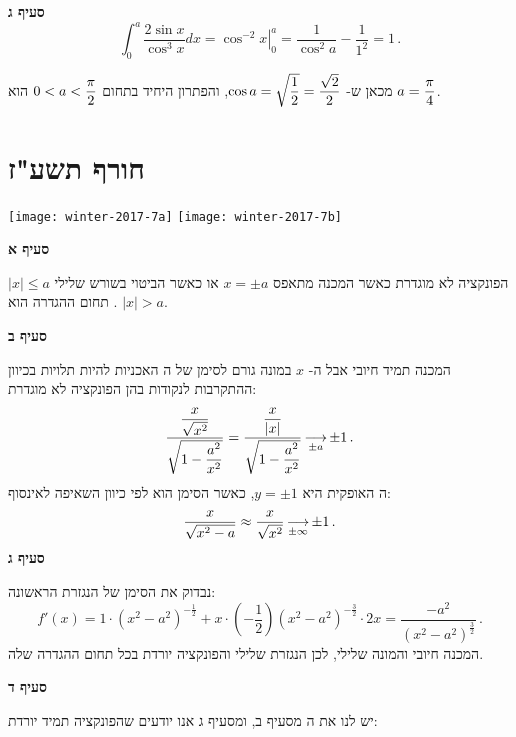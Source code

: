 \textbf{סעיף ג}
\[
\int_0^a \frac{2\sin x}{\cos^3 x}dx = \left. \cos^{-2} x \right|_0^a=\frac{1}{\cos^2 a}-\frac{1}{1^2}=1\,.
\]

מכאן ש-%
$\cos a=\sqrt{\displaystyle\frac{1}{2}}=\displaystyle\frac{\sqrt{2}}{2}$,
והפתרון היחיד בתחום
$0<a<\displaystyle\frac{\pi}{2}$
הוא
$a=\displaystyle\frac{\pi}{4}$.

\np



\section{חורף תשע"ז}

\begin{center}
\texttt{[image: winter-2017-7a]}
\texttt{[image: winter-2017-7b]}
\end{center}

\vspace{-2ex}

\textbf{סעיף א}

הפונקציה לא מוגדרת כאשר המכנה מתאפס
$x=\pm a$
או כאשר הביטוי בשורש שלילי
$|x|\leq a$.
תחום ההגדרה הוא
$|x|>a$.

\textbf{סעיף ב}

המכנה תמיד חיובי אבל ה-%
$x$
במונה גורם לסימן של ה%
\asms{}
האכניות להיות תלויות בכיוון ההתקרבות לנקודות בהן הפונקציה לא מוגדרת:
\[
\frac{\displaystyle\frac{x}{\sqrt{x^2}}}{\sqrt{1-\displaystyle\frac{a^2}{x^2}}}=\displaystyle\frac{\displaystyle\frac{x}{|x|}}{\sqrt{1-\displaystyle\frac{a^2}{x^2}}}\mathop{\longrightarrow}\limits_{\pm a}\pm 1\,.
\]
ה%
\asm{}
האופקית היא
$y=\pm 1$,
כאשר הסימן הוא לפי כיוון השאיפה לאינסוף:
\[
\frac{x}{\sqrt{x^2-a}}\approx \frac{x}{\sqrt{x^2}}\mathop{\longrightarrow}\limits_{\pm\infty} \pm 1\,.
\]
\textbf{סעיף ג}

נבדוק את הסימן של הנגזרת הראשונה:
\[
f'(x)=1\cdot(x^2-a^2)^{-\frac{1}{2}} + x\cdot \left(-\frac{1}{2}\right)(x^2-a^2)^{-\frac{3}{2}}\cdot 2x=\frac{-a^2}{(x^2-a^2)^{\frac{3}{2}}}\,.
\]
המכנה חיובי והמונה שלילי, לכן הנגזרת שלילי והפונקציה יורדת בכל תחום ההגדרה שלה.

\np

\textbf{סעיף ד}

יש לנו את ה%
\asms{}
מסעיף ב, ומסעיף ג אנו יודעים שהפונקציה תמיד יורדת:

\vspace{-1ex}


